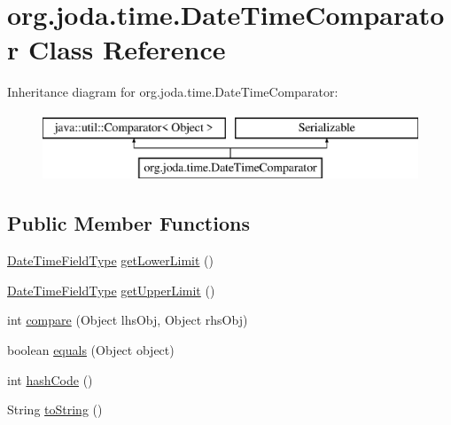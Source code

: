 \hypertarget{classorg_1_1joda_1_1time_1_1_date_time_comparator}{\section{org.\-joda.\-time.\-Date\-Time\-Comparator Class Reference}
\label{classorg_1_1joda_1_1time_1_1_date_time_comparator}
}
Inheritance diagram for org.\-joda.\-time.\-Date\-Time\-Comparator\-:\begin{figure}[H]
\begin{center}
\leavevmode
\includegraphics[height=2.000000cm]{classorg_1_1joda_1_1time_1_1_date_time_comparator}
\end{center}
\end{figure}
\subsection*{Public Member Functions}
\begin{DoxyCompactItemize}
\item 
\hyperlink{classorg_1_1joda_1_1time_1_1_date_time_field_type}{Date\-Time\-Field\-Type} \hyperlink{classorg_1_1joda_1_1time_1_1_date_time_comparator_aaa7558ddfb781759e30ef81768508413}{get\-Lower\-Limit} ()
\item 
\hyperlink{classorg_1_1joda_1_1time_1_1_date_time_field_type}{Date\-Time\-Field\-Type} \hyperlink{classorg_1_1joda_1_1time_1_1_date_time_comparator_a416d0ba16847e6c6fb53b64e4fbe87a3}{get\-Upper\-Limit} ()
\item 
int \hyperlink{classorg_1_1joda_1_1time_1_1_date_time_comparator_a03ddd41c345429c5b77da153698fa1d4}{compare} (Object lhs\-Obj, Object rhs\-Obj)
\item 
boolean \hyperlink{classorg_1_1joda_1_1time_1_1_date_time_comparator_ab3da27b333fe7a8868bc1056affcd1c4}{equals} (Object object)
\item 
int \hyperlink{classorg_1_1joda_1_1time_1_1_date_time_comparator_a5691864cb95015ff398b5674eea51c22}{hash\-Code} ()
\item 
String \hyperlink{classorg_1_1joda_1_1time_1_1_date_time_comparator_a05e966c59d1c977533775f444b63a0bb}{to\-String} ()
\end{DoxyCompactItemize}
